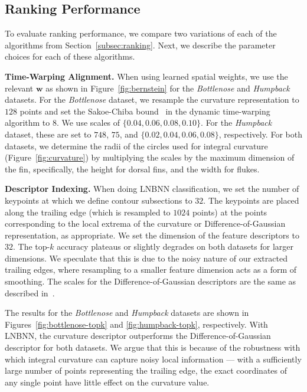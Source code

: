 \documentclass[10pt,twocolumn,letterpaper]{article}
\begin{document}
\subsection{Ranking Performance}
\label{subsec:ranking-performance}
To evaluate ranking performance, we compare two variations of each of
the algorithms from Section~\ref{subsec:ranking}.  Next, we
describe the parameter choices for each of these algorithms.

\textbf{Time-Warping Alignment.}
When using learned spatial weights,
we use the relevant $\mathbf{w}$ as shown in Figure~\ref{fig:bernstein} for the
\emph{Bottlenose} and \emph{Humpback} datasets.  For the \emph{Bottlenose}
dataset, we resample the curvature representation to $128$ points and set the
Sakoe-Chiba bound~\cite{Sakoe78} in the dynamic time-warping algorithm to $8$.
We use scales of $\{0.04, 0.06, 0.08, 0.10\}$.  For the
\emph{Humpback} dataset, these are set to $748$, $75$, and $\{0.02, 0.04, 0.06,
0.08\}$, respectively.  For both datasets, we determine the radii of the
circles used for integral curvature (Figure~\ref{fig:curvature}) by multiplying the scales by the maximum
dimension of the fin, specifically, the height for dorsal fins, and the width
for flukes.

\textbf{Descriptor Indexing.}
When doing LNBNN classification, we set the number of keypoints at which we
define contour subsections to $32$.  The keypoints are placed along the trailing edge
(which is resampled to $1024$ points) at
the points corresponding to the local extrema of the
curvature or Difference-of-Gaussian representation, as appropriate.
We set the dimension of the feature descriptors to $32$.  The
top-$k$ accuracy plateaus or slightly degrades on both datasets for larger
dimensions.  We speculate that this is due to the noisy nature of our extracted
trailing edges, where resampling to a smaller feature dimension acts as a form
of smoothing.  The scales for the Difference-of-Gaussian descriptors 
are the same as described in~\cite{Hughes16}.

The results for the \emph{Bottlenose} and \emph{Humpback} datasets are
shown in Figures~\ref{fig:bottlenose-topk} and \ref{fig:humpback-topk},
respectively.  With LNBNN, the curvature descriptor outperforms the Difference-of-Gaussian
descriptor for both datasets.  We argue that this is because of the robustness
with which integral curvature can capture noisy local information --- with a
sufficiently large number of points representing the trailing edge, the
exact coordinates of any single point have little effect on the curvature
value.
\end{document}
